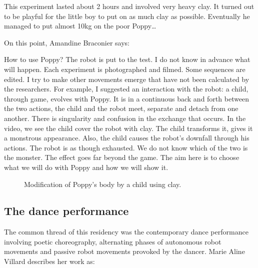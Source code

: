 This experiment lasted about 2 hours and involved very heavy  clay. It turned out to be playful for the little boy to put on as much clay as possible. Eventually he managed to put almost 10kg on the poor Poppy\dots

On this point, Amandine Braconier says:
\begin{formal}
    How to use Poppy? The robot is put to the test. I do not know in advance what will happen. Each experiment is photographed and filmed. Some sequences are edited. I try to make other movements emerge that have not been calculated by the researchers. For example, I suggested an interaction with the robot: a child, through game, evolves with Poppy. It is in a continuous back and forth  between the two actions, the child and the robot meet, separate and detach from one another. There is singularity and confusion in the exchange that occurs. In the video, we see the child cover the robot with clay. The child transforms it, gives it a monstrous appearance. Also, the child causes the robot’s downfall through his actions. The robot is as though exhausted. We do not know which of the two is the monster. The effect goes far beyond the game. The aim here is to choose what we will do with Poppy and how we will show it.

\end{formal}

\begin{figure}[tb]
\centering
    \hfill
    \caption{Modification of Poppy's body by a child using clay.}
    \label{fig:clay_on_poppy}
\end{figure}

\subsection{The dance performance} %

The common thread of this residency was the contemporary dance performance involving poetic choreography, alternating phases of autonomous robot movements and passive robot movements provoked by the dancer. Marie Aline Villard describes her work as:

